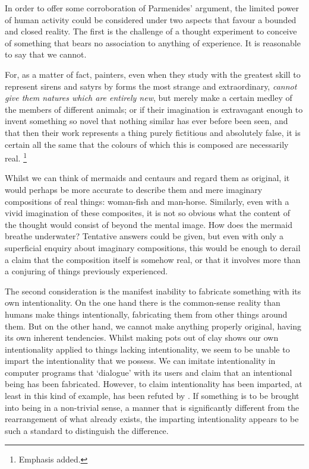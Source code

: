 In order to offer some corroboration of Parmenides' argument, the limited power of human activity could be considered under two aspects that favour a bounded and closed reality.
The first is the challenge of a thought experiment to conceive of something that bears no association to anything of experience. It is reasonable to say that we cannot.
\begin{quoting}
For, as a matter of fact, painters, even when they study with the greatest skill to represent sirens and satyrs by forms the most strange and extraordinary, \emph{cannot give them natures which are entirely new}, but merely make a certain medley of the members of different animals; or if their imagination is extravagant enough to invent something so novel that nothing similar has ever before been seen, and that then their work represents a thing purely fictitious and absolutely false, it is certain all the same that the colours of which this is composed are necessarily real. \parencite[][7]{descartes-meditations}\footnote{Emphasis added.}
\end{quoting}
Whilst we can think of mermaids and centaurs and regard them as original, it would perhaps be more accurate to describe them and mere imaginary compositions of real things: woman-fish and man-horse. Similarly, even with a vivid imagination of these composites, it is not so obvious what the content of the thought would consist of beyond the mental image. How does the mermaid breathe underwater? Tentative answers could be given, but even with only a superficial enquiry about imaginary compositions, this would be enough to derail a claim that the composition itself is somehow real, or that it involves more than a conjuring of things previously experienced.

The second consideration is the manifest inability to fabricate something with its own intentionality. On the one hand there is the common-sense reality than humans make things intentionally, fabricating them from other things around them. But on the other hand, we cannot make anything properly original, having its own inherent tendencies. Whilst making pots out of clay shows our own intentionality applied to things lacking intentionality, we seem to be unable to impart the intentionality that we possess. We can imitate intentionality in computer programs that `dialogue' with its users and claim that an intentional being has been fabricated. However, to claim intentionality has been imparted, at least in this kind of example, has been refuted by \textcite[][]{Searle1980-SEAMBA}. If something is to be brought into being in a non-trivial sense, a manner that is significantly different from the rearrangement of what already exists, the imparting intentionality appears to be such a standard to distinguish the difference.

